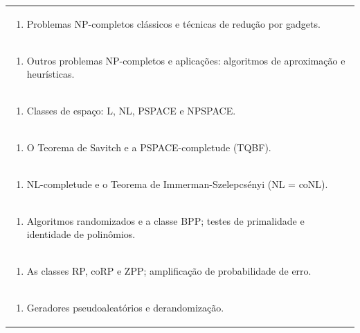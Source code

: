 \documentclass[11pt]{article}
\begin{document}
\begin{center}
\begin{longtable}{|p{4cm}|p{4cm}|p{4cm}|p{4cm}|}
\multicolumn{4}{|p{\dimexpr 16cm + 6\tabcolsep\relax}|}{\begin{enumerate}[start=16]\item Problemas NP-completos clássicos e técnicas de redução por gadgets.\end{enumerate}}\\
\multicolumn{4}{|p{\dimexpr 16cm + 6\tabcolsep\relax}|}{\begin{enumerate}[start=17]\item Outros problemas NP-completos e aplicações: algoritmos de aproximação e heurísticas.\end{enumerate}}\\
\multicolumn{4}{|p{\dimexpr 16cm + 6\tabcolsep\relax}|}{\begin{enumerate}[start=18]\item Classes de espaço: L, NL, PSPACE e NPSPACE.\end{enumerate}}\\
\multicolumn{4}{|p{\dimexpr 16cm + 6\tabcolsep\relax}|}{\begin{enumerate}[start=19]\item O Teorema de Savitch e a PSPACE-completude (TQBF).\end{enumerate}}\\
\multicolumn{4}{|p{\dimexpr 16cm + 6\tabcolsep\relax}|}{\begin{enumerate}[start=20]\item NL-completude e o Teorema de Immerman-Szelepcsényi (NL = coNL).\end{enumerate}}\\
\multicolumn{4}{|p{\dimexpr 16cm + 6\tabcolsep\relax}|}{\begin{enumerate}[start=21]\item Algoritmos randomizados e a classe BPP; testes de primalidade e identidade de polinômios.\end{enumerate}}\\
\multicolumn{4}{|p{\dimexpr 16cm + 6\tabcolsep\relax}|}{\begin{enumerate}[start=22]\item As classes RP, coRP e ZPP; amplificação de probabilidade de erro.\end{enumerate}}\\
\multicolumn{4}{|p{\dimexpr 16cm + 6\tabcolsep\relax}|}{\begin{enumerate}[start=23]\item Geradores pseudoaleatórios e derandomização.\end{enumerate}}\\

\end{longtable}
\end{center}
\end{document}
